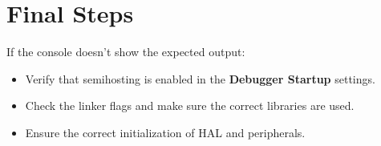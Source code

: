 \documentclass{article}
\begin{document}
\section{Final Steps}
If the console doesn't show the expected output:
\begin{itemize}
  \item Verify that semihosting is enabled in the \textbf{Debugger Startup} settings.
  \item Check the linker flags and make sure the correct libraries are used.
  \item Ensure the correct initialization of HAL and peripherals.
\end{itemize}
\end{document}
